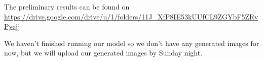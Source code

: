 \documentclass{article}
\begin{document}
The preliminary results can be found on \href{https://drive.google.com/drive/u/1/folders/11J_XfP8IE53kUUfCL9ZGYbF5ZRvPyejj}{https://drive.google.com/drive/u/1/folders/11J_XfP8IE53kUUfCL9ZGYbF5ZRvPyejj}

We haven't finished running our model so we don't have any generated images for now, but we will upload our generated images by Sunday night.

\newpage

\nocite{langley00}








\end{document}
